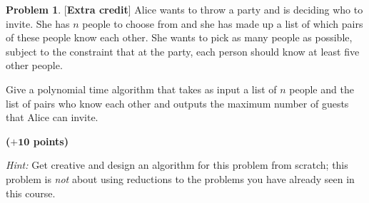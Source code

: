 \documentclass{article}
\theoremstyle{definition}
\newtheorem{problem}{Problem}
\newcommand{\grade}[1]{\hfill{\textbf{($\mathbf{#1}$ points)}}}
\begin{document}
\newpage

\begin{problem}\label{extra}[\textbf{Extra credit}]
	Alice wants to throw a party and is deciding who to invite. She has $n$ people to choose from
and she has made up a list of which pairs of these people know each other. She wants to pick as many people as 
possible, subject to the constraint that at the party, each person should know at least five other people.

Give a polynomial time algorithm that takes as input a list of $n$ people and the list of pairs who know 
each other and outputs the maximum number of guests that Alice can invite. 

	 \grade{+10}
	 
\medskip
\emph{Hint:} Get creative and design an algorithm for this problem from scratch; this problem is \emph{not} about using  reductions to the problems you have already seen in this course. 
\end{problem}
\end{document}
